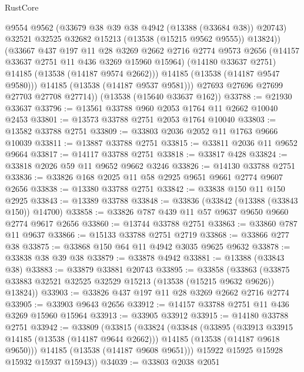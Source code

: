 \begin{lexlean}{RustCore}
\begin{coremodule}
                @9554
                @9562
                (@33679 @38 @39 @38 @4942 (@13388 (@33684 @38)) @20743)
                @32521
                @32525
                @32682
                @15213
                (@13538 (@15215 @9562 @9555))
                @13824))
            (@33667
              @437
              @197
              @11
              @28
              @3269
              @2662
              @2716
              @2774
              @9573
              @2656
              (@14157 @33637 @2751 @11 @436 @3269 @15960 @15964)
              (@14180 @33637 @2751)
              @14185
              (@13538 (@14187 @9574 @2662)))
            @14185
            (@13538 (@14187 @9547 @9580)))
          @14185
          (@13538 (@14187 @9537 @9581)))
        @27693
        @27696
        @27699
        @27703
        @27708
        @27714))
    (@13538 (@15640 @33637 @162))
@33788 := @21930 @33637
@33796 := @13561 @33788 @960 @2053 @1764 @11 @2662 @10040 @2453
@33801 := @13573 @33788 @2751 @2053 @1764 @10040
@33803 := @13582 @33788 @2751
@33809 := @33803 @2036 @2052 @11 @1763 @9666 @10039
@33811 := @13887 @33788 @2751
@33815 := @33811 @2036 @11 @9652 @9664
@33817 := @14117 @33788 @2751
@33818 := @33817 @428
@33824 := @33818 @2026 @59 @11 @9652 @9662 @3246
@33826 := @14130 @33788 @2751
@33836 := @33826 @168 @2025 @11 @58 @2925 @9651 @9661 @2774 @9607 @2656
@33838 := @13380 @33788 @2751
@33842 := @33838 @150 @11 @150 @2925
@33843 := @13389 @33788
@33848 := @33836 (@33842 (@13388 (@33843 @150)) @14700)
@33858 := @33826 @787 @439 @11 @57 @9637 @9650 @9660 @2774 @9617 @2656
@33860 := @13744 @33788 @2751
@33863 := @33860 @787 @11 @9637
@33866 := @15133 @33788 @2751 @2719
@33868 := @33866 @277 @38
@33875 := @33868 @150 @64 @11 @4942 @3035 @9625 @9632
@33878 := @33838 @38 @39 @38
@33879 := @33878 @4942
@33881 := @13388 (@33843 @38)
@33883 := @33879 @33881 @20743
@33895 := @33858
    (@33863 (@33875 @33883 @32521 @32525 @32529 @15213 (@13538 (@15215 @9632 @9626)) @13824))
@33903 := @33826 @437 @197 @11 @28 @3269 @2662 @2716 @2774
@33905 := @33903 @9643 @2656
@33912 := @14157 @33788 @2751 @11 @436 @3269 @15960 @15964
@33913 := @33905 @33912
@33915 := @14180 @33788 @2751
@33942 := @33809
    (@33815
      (@33824
        (@33848
          (@33895
            (@33913 @33915 @14185 (@13538 (@14187 @9644 @2662)))
            @14185
            (@13538 (@14187 @9618 @9650)))
          @14185
          (@13538 (@14187 @9608 @9651)))
        @15922
        @15925
        @15928
        @15932
        @15937
        @15943))
@34039 := @33803
    @2038
    @2051

\end{coremodule}
\end{lexlean}
